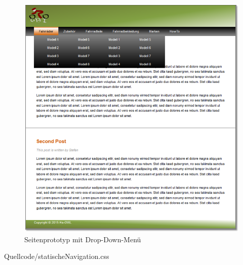 \begin{figure}[H]
\begin{center}
\includegraphics[width=150mm]{Bilder/Abbildung4-SeitenprototypMitDropDownMenue.png}
\end{center}
\caption{Seitenprototyp mit Drop-Down-Menü}
\end{figure}

\newpage
\begin{center}
	\begin{lstinputlisting}[language=CSS, caption={Auszug aus der CSS Datei - Die Seitennavigation}]
		{Quellcode/statischeNavigation.css}
	\end{lstinputlisting}
\end{center}



